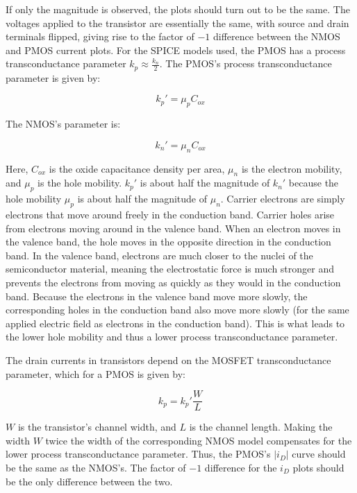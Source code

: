 \FloatBarrier

If only the magnitude is observed, the plots should turn out to be the same. The voltages applied to the transistor are essentially the same, with source and drain terminals flipped, giving rise to the factor of $-1$ difference between the NMOS and PMOS current plots. For the SPICE models used, the PMOS has a process transconductance parameter $k_p \approx \frac{k_n}{2}$. The PMOS's process transconductance parameter is given by:

\begin{equation}
	\label{eq:pmos_trans}
	k_p' = \mu _{p} C_{ox}
\end{equation}

The NMOS's parameter is:

\begin{equation}
	\label{eq:nmos_trans}
	k_n' = \mu _{n} C_{ox}
\end{equation}

Here, $C_{ox}$ is the oxide capacitance density per area, $\mu _{n}$ is the electron mobility, and $\mu _{p}$ is the hole mobility. $k_p'$ is about half the magnitude of $k_n'$ because the hole mobility $\mu _{p}$ is about half the magnitude of $\mu _{n}$. Carrier electrons are simply electrons that move around freely in the conduction band. Carrier holes arise from electrons moving around in the valence band. When an electron moves in the valence band, the hole moves in the opposite direction in the conduction band. In the valence band, electrons are much closer to the nuclei of the semiconductor material, meaning the electrostatic force is much stronger and prevents the electrons from moving as quickly as they would in the conduction band. Because the electrons in the valence band move more slowly, the corresponding holes in the conduction band also move more slowly (for the same applied electric field as electrons in the conduction band). This is what leads to the lower hole mobility and thus a lower process transconductance parameter.

The drain currents in transistors depend on the MOSFET transconductance parameter, which for a PMOS is given by:

\begin{equation}
	\label{eq:pmos_fettrans}
	k_p = k_p' \frac{W}{L}
\end{equation}


$W$ is the transistor's channel width, and $L$ is the channel length. Making the width $W$ twice the width of the corresponding NMOS model compensates for the lower process transconductance parameter. Thus, the PMOS's $|i_D|$ curve should be the same as the NMOS's. The factor of $-1$ difference for the $i_D$ plots should be the only difference between the two.

